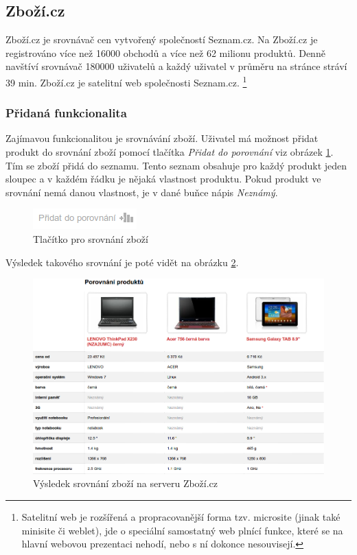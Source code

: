 \subsection{Zboží.cz}
Zboží.cz je srovnávač cen vytvořený společností Seznam.cz. Na Zboží.cz je registrováno více než 16000 obchodů a více než 62 milionu produktů. Denně navštíví srovnávač 180000 uživatelů a každý uživatel v průměru na stránce stráví 39 min.\cite{website:zbozi-about}
Zboží.cz je satelitní web společnosti Seznam.cz.
\footnote{Satelitní web je rozšířená a propracovanější forma tzv. microsite (jinak také minisite či weblet), jde o speciální samostatný web plnící funkce, které se na hlavní webovou prezentaci nehodí, nebo s ní dokonce nesouvisejí.}
\subsubsection{Přidaná funkcionalita}
Zajímavou funkcionalitou je srovnávání zboží. Uživatel má možnost přidat produkt do srovnání zboží pomocí tlačítka \emph{Přidat do porovnání} viz obrázek \ref{fig:zbozicz-srovnat}. Tím se zboží přidá do seznamu. Tento seznam obsahuje pro každý produkt jeden sloupec a v každém řádku je nějaká vlastnost produktu. Pokud produkt ve srovnání nemá danou vlastnost, je v dané buňce nápis \emph{Neznámý}.

\begin{figure}[htb]
\begin{center}
\includegraphics[width=40mm]{./pictures/zbozicz-srovnat.png}
\caption{Tlačítko pro srovnání zboží}
\label{fig:zbozicz-srovnat}
\end{center}
\end{figure}

Výsledek takového srovnání je poté vidět na obrázku \ref{fig:zbozicz-srovnani}.

\begin{figure}[htb]
\begin{center}
\includegraphics[width=130mm]{./pictures/zbozicz-srovnani.png}
\caption{Výsledek srovnání zboží na serveru Zboží.cz}
\label{fig:zbozicz-srovnani}
\end{center}
\end{figure}

